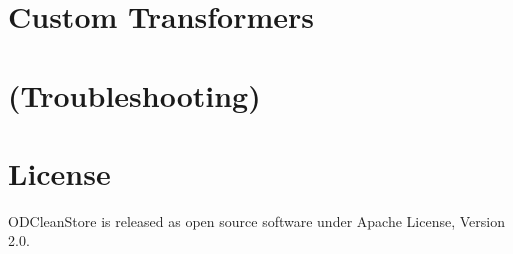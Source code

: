 
\chapter{Custom Transformers}

\chapter{(Troubleshooting)}



\appendix

\chapter{License}
ODCleanStore is released as open source software under Apache License, Version 2.0.

